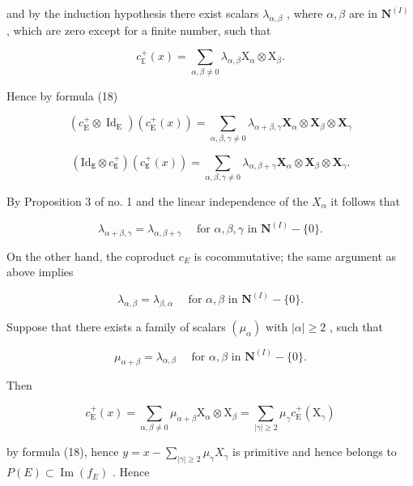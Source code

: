 and by the induction hypothesis there exist scalars \(\lambda_{\alpha, \beta}\) , where \(\alpha, \beta\) are in \(\mathbf{N}^{(I)}\) , which are zero except for a finite number, such that

\[
c _ {\mathbb {E}} ^ {+} (x) = \sum_ {\alpha , \beta \neq 0} \lambda_ {\alpha , \beta} \mathrm{X} _ {\alpha} \otimes \mathrm{X} _ {\beta}.\tag{19}
\]

Hence by formula (18)

\[
(c _ {\mathrm{E}} ^ {+} \otimes \operatorname{Id} _ {\mathrm{E}}) (c _ {\mathrm{E}} ^ {+} (x)) = \sum_ {\alpha , \beta , \gamma \neq 0} \lambda_ {\alpha + \beta , \gamma} \mathbf {X} _ {\alpha} \otimes \mathbf {X} _ {\beta} \otimes \mathbf {X} _ {\gamma}
\]

\[
(\mathrm{Id} _ {\mathtt {E}} \otimes c _ {\mathtt {E}} ^ {+}) (c _ {\mathtt {E}} ^ {+} (x)) = \sum_ {\alpha , \beta , \gamma \neq 0} \lambda_ {\alpha , \beta + \gamma} \mathbf {X} _ {\alpha} \otimes \mathbf {X} _ {\beta} \otimes \mathbf {X} _ {\gamma}.
\]

By Proposition 3 of no. 1 and the linear independence of the \(X_{\alpha}\) it follows that

\[
\lambda_ {\alpha + \beta , \gamma} = \lambda_ {\alpha , \beta + \gamma} \quad \text { for } \alpha , \beta , \gamma \text { in } \mathbf {N} ^ {(I)} - \{0 \}.\tag{20}
\]

On the other hand, the coproduct \(c_{E}\) is cocommutative; the same argument as above implies

\[
\lambda_ {\alpha , \beta} = \lambda_ {\beta , \alpha} \quad \text { for } \alpha , \beta \text { in } \mathbf {N} ^ {(I)} - \{0 \}.\tag{21}
\]

Suppose that there exists a family of scalars \((\mu_{\alpha})\) with \(|\alpha| \geqslant 2\) , such that

\[
\mu_ {\alpha + \beta} = \lambda_ {\alpha , \beta} \quad \text { for } \alpha , \beta \text { in } \mathbf {N} ^ {(I)} - \{0 \}.\tag{22}
\]

Then

\[
c _ {\mathrm{E}} ^ {+} (x) = \sum_ {\alpha , \beta \neq 0} \mu_ {\alpha + \beta} \mathrm{X} _ {\alpha} \otimes \mathrm{X} _ {\beta} = \sum_ {| \gamma | \geqslant 2} \mu_ {\gamma} c _ {\mathrm{E}} ^ {+} (\mathrm{X} _ {\gamma})
\]

by formula (18), hence \(y = x - \sum_{|\gamma| \geq 2} \mu_\gamma X_\gamma\) is primitive and hence belongs to \(P(E) \subset \operatorname{Im}(f_E)\) . Hence

